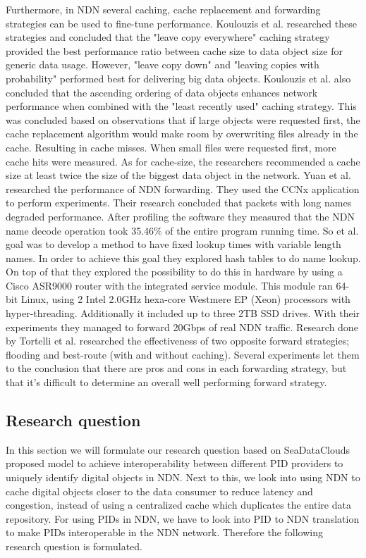 Furthermore, in NDN several caching, cache replacement and forwarding strategies can be used to fine-tune performance. Koulouzis et al. researched these strategies and concluded that the "leave copy everywhere" caching strategy provided the best performance ratio between cache size to data object size for generic data usage. However, "leave copy down" and "leaving copies with probability" performed best for delivering big data objects. Koulouzis et al. also concluded that the ascending ordering of data objects enhances network performance when combined with the "least recently used" caching strategy. This was concluded based on observations that if large objects were requested first, the cache replacement algorithm would make room by overwriting files already in the cache. Resulting in cache misses. When small files were requested first, more cache hits were measured. As for cache-size, the researchers recommended a cache size at least twice the size of the biggest data object in the network. Yuan et al. \cite{yuan2012scalable} researched the performance of NDN forwarding. They used the CCNx application to perform experiments. Their research concluded that packets with long names degraded performance. After profiling the software they measured that the NDN name decode operation took 35.46\% of the entire program running time. So et al. \cite{so2013named} goal was to develop a method to have fixed lookup times with variable length names. In order to achieve this goal they explored hash tables to do name lookup. On top of that they explored the possibility to do this in hardware by using a Cisco ASR9000 router with the integrated service module. This module ran 64-bit Linux, using 2 Intel 2.0GHz hexa-core Westmere EP (Xeon) processors with hyper-threading. Additionally it included up to three 2TB SSD drives. With their experiments they managed to forward 20Gbps of real NDN traffic. Research done by Tortelli et al. \cite{tortelli2013performance} researched the effectiveness of two opposite forward strategies; flooding and best-route (with and without caching). Several experiments let them to the conclusion that there are pros and cons in each forwarding strategy, but that it's difficult to determine an overall well performing forward strategy.

\subsection{Research question}
In this section we will formulate our research question based on SeaDataClouds proposed model to achieve interoperability between different PID providers to uniquely identify digital objects in NDN. Next to this, we look into using NDN to cache digital objects closer to the data consumer to reduce latency and congestion, instead of using a centralized cache which duplicates the entire data repository. For using PIDs in NDN, we have to look into PID to NDN translation to make PIDs interoperable in the NDN network. Therefore the following research question is formulated.

